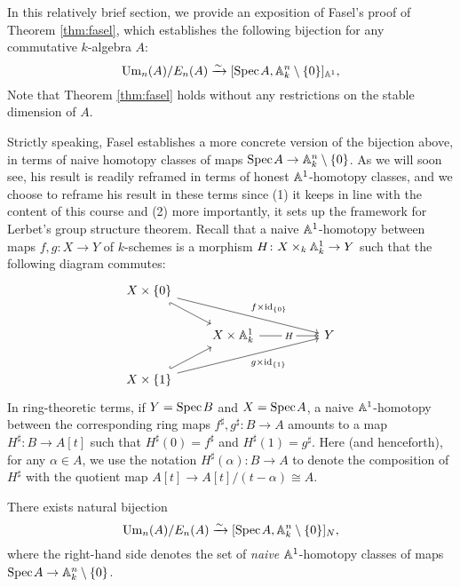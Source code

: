 In this relatively brief section, we provide an exposition of Fasel's proof of Theorem \ref{thm:fasel}, which establishes the following bijection for any commutative $k$-algebra $A$:
\[
\mathrm{Um}_n(A)/E_n(A) \xrightarrow{\sim} [\text{Spec}\hspace{0.1em} A, \mathbb{A}^n_k\setminus \{0\}]_{\mathbb{A}^1},
\]
Note that Theorem \ref{thm:fasel} holds without any restrictions on the stable dimension of $A$.

Strictly speaking, Fasel establishes a more concrete version of the bijection above, in terms of naive homotopy classes of maps $\text{Spec}\hspace{0.1em} A \to \mathbb{A}^n_k\setminus\{0\}$. As we will soon see, his result is readily reframed in terms of honest $\mathbb{A}^1$-homotopy classes, and we choose to reframe his result in these terms since (1) it keeps in line with the content of this course and (2) more importantly, it sets up the framework for Lerbet's group structure theorem. Recall that a naive $\mathbb{A}^1$-homotopy between maps $f,g\colon X \to Y$ of $k$-schemes is a morphism $H\colon X \times_k \mathbb{A}^1_k \to Y$ such that the following diagram commutes:
\[\begin{tikzcd}
	{X \times\{0\}} \\
	& {X \times\mathbb{A}^1_k} && Y \\
	{X \times \{1\}}
	\arrow[hook', from=1-1, to=2-2]
	\arrow["{f \times \operatorname{id}_{\{0\}}}", from=1-1, to=2-4]
	\arrow["H"{description}, from=2-2, to=2-4]
	\arrow[hook, from=3-1, to=2-2]
	\arrow["{g \times \operatorname{id}_{\{1\}}}"', from=3-1, to=2-4]
\end{tikzcd}\]
In ring-theoretic terms, if $Y = \text{Spec}\hspace{0.1em} B$ and $X = \text{Spec}\hspace{0.1em} A$, a naive $\mathbb{A}^1$-homotopy between the corresponding ring maps $f^\sharp, g^\sharp\colon B \to A$ amounts to a map $H^\sharp\colon B \to A[t]$ such that $H^\sharp(0) = f^\sharp$ and $H^\sharp(1) = g^\sharp$. Here (and henceforth), for any $\alpha \in A$, we use the notation $H^\sharp(\alpha)\colon B \to A$ to denote the composition of $H^\sharp$ with the quotient map $A[t] \to A[t]/(t - \alpha) \cong A$.

\begin{proposition}\cite[Theorem 2.1]{Fasel-unim}\label{prop:fasel_naive}
    There exists natural bijection
    \[
    \mathrm{Um}_n(A)/E_n(A) \xrightarrow{\sim} [\text{Spec}\hspace{0.1em} A, \mathbb{A}^n_k\setminus \{0\}]_{N},
    \]
    where the right-hand side denotes the set of \textit{naive} $\mathbb{A}^1$-homotopy classes of maps $\text{Spec}\hspace{0.1em} A \to \mathbb{A}^n_k \setminus\{0\}$. 
\end{proposition}

